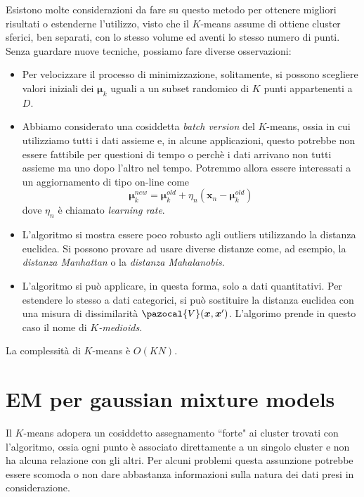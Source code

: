 \documentclass{report}
\begin{document}
Esistono molte considerazioni da fare su questo metodo per ottenere migliori risultati o estenderne l'utilizzo, visto che il $K$-means assume di ottiene cluster sferici, ben separati, con lo stesso volume ed aventi lo stesso numero di punti. Senza guardare nuove tecniche, possiamo fare diverse osservazioni:
\begin{itemize}
	\item Per velocizzare il processo di minimizzazione, solitamente, si possono scegliere valori iniziali dei $\bm\mu_k$ uguali a un subset randomico di $K$ punti appartenenti a $D$.
	\item Abbiamo considerato una cosiddetta \textit{batch version} del $K$-means, ossia in cui utilizziamo tutti i dati assieme e, in alcune applicazioni, questo potrebbe non essere fattibile per questioni di tempo o perchè i dati arrivano non tutti assieme ma uno dopo l'altro nel tempo. Potremmo allora essere interessati a un aggiornamento di tipo on-line come
	\begin{equation}
	\bm\mu_k^{new} = \bm\mu_k^{old} + \eta_n(\bm{x}_n - \bm\mu_k^{old})
	\end{equation}
	dove $\eta_n$ è chiamato \textit{learning rate}.
	\item L'algoritmo si mostra essere poco robusto agli outliers utilizzando la distanza euclidea. Si possono provare ad usare diverse distanze come, ad esempio, la \textit{distanza Manhattan} o la \textit{distanza Mahalanobis}.
	\item L'algoritmo si può applicare, in questa forma, solo a dati quantitativi. Per estendere lo stesso a dati categorici, si può sostituire la distanza euclidea con una misura di dissimilarità $\pazocal{V}(\bm{x},\bm{x}')$. L'algorimo prende in questo caso il nome di \textit{$K$-medioids}.
\end{itemize}

La complessità di $K$-means è $O(KN)$.

\section{EM per gaussian mixture models}

Il $K$-means adopera un cosiddetto assegnamento ``forte" ai cluster trovati con l'algoritmo, ossia ogni punto è associato direttamente a un singolo cluster e non ha alcuna relazione con gli altri. Per alcuni problemi questa assunzione potrebbe essere scomoda o non dare abbastanza informazioni sulla natura dei dati presi in considerazione.
\end{document}
